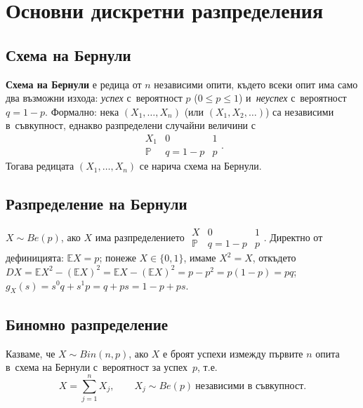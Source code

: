 \chapter{Основни дискретни разпределения}

\section{Схема на Бернули}

\begin{defbox}
\textbf{Схема на Бернули} е редица от $n$ независими опити, където
всеки опит има само два възможни изхода: \emph{успех} с~вероятност
$p$ ($0\le p\le1$) и~\emph{неуспех} с~вероятност $q=1-p$. Формално:
нека $(X_1,\dots,X_n)$ (или $(X_1,X_2,\dots)$) са независими в~съвкупност, еднакво разпределени случайни величини с~\[
  \begin{array}{c|cc} X_1 & 0 & 1\\\hline \mathbb P & q{=}1{-}p & p\end{array}.
\]
Тогава редицата $(X_1,\dots,X_n)$ се нарича схема на Бернули.
\end{defbox}

\section{Разпределение на Бернули}

\begin{defbox}
$X\sim Be(p)$, ако $X$ има разпределението
$\begin{array}{c|cc} X & 0 & 1\\\hline \mathbb P & q{=}1{-}p & p\end{array}$.
Директно от дефиницията: $\mathbb EX=p$; понеже $X\in\{0,1\}$, имаме
$X^2=X$, откъдето $DX=\mathbb EX^2-(\mathbb EX)^2=\mathbb EX-(\mathbb
EX)^2=p-p^2=p(1-p)=pq$; $g_X(s)=s^0q+s^1p=q+ps=1-p+ps$.
\end{defbox}

\section{Биномно разпределение}

\begin{defbox}
Казваме, че $X\sim Bin(n,p)$, ако $X$ е броят успехи измежду първите
$n$ опита в~схема на Бернули с~вероятност за успех~$p$, т.е.
\[
  X = \sum_{j=1}^{n} X_j, \qquad X_j \sim Be(p)\ \text{независими в~съвкупност}.
\]
\end{defbox}

